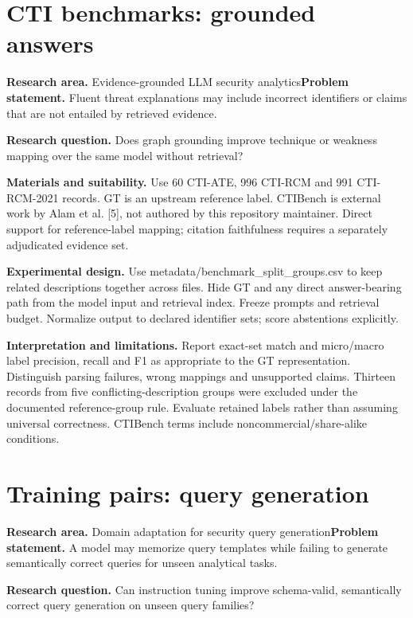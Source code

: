 \clearpage\section{CTI benchmarks: grounded answers}
\textbf{Research area.} Evidence-grounded LLM security analytics\newline \textbf{Problem statement.} Fluent threat explanations may include incorrect identifiers or claims that are not entailed by retrieved evidence.

\textbf{Research question.} Does graph grounding improve technique or weakness mapping over the same model without retrieval?

\textbf{Materials and suitability.} Use 60 CTI-ATE, 996 CTI-RCM and 991 CTI-RCM-2021 records. GT is an upstream reference label. CTIBench is external work by Alam et al. [5], not authored by this repository maintainer. Direct support for reference-label mapping; citation faithfulness requires a separately adjudicated evidence set.

\textbf{Experimental design.} Use metadata/benchmark\_split\_groups.csv to keep related descriptions together across files. Hide GT and any direct answer-bearing path from the model input and retrieval index. Freeze prompts and retrieval budget. Normalize output to declared identifier sets; score abstentions explicitly.

\textbf{Interpretation and limitations.} Report exact-set match and micro/macro label precision, recall and F1 as appropriate to the GT representation. Distinguish parsing failures, wrong mappings and unsupported claims. Thirteen records from five conflicting-description groups were excluded under the documented reference-group rule. Evaluate retained labels rather than assuming universal correctness. CTIBench terms include noncommercial/share-alike conditions.

\clearpage\section{Training pairs: query generation}
\textbf{Research area.} Domain adaptation for security query generation\newline \textbf{Problem statement.} A model may memorize query templates while failing to generate semantically correct queries for unseen analytical tasks.

\textbf{Research question.} Can instruction tuning improve schema-valid, semantically correct query generation on unseen query families?

